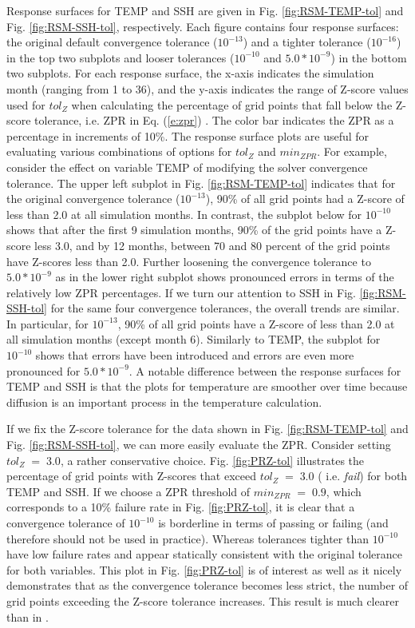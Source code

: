 \documentclass[gmd, manuscript]{copernicus}
\begin{document}
Response surfaces for TEMP and SSH are given in Fig. \ref{fig:RSM-TEMP-tol} and Fig. \ref{fig:RSM-SSH-tol}, respectively.  Each figure contains four response surfaces: the original default convergence tolerance ($10^{-13}$) and a tighter tolerance ($10^{-16}$) in the top two subplots and looser tolerances ($10^{-10}$ and $5.0*10^{-9}$) in the bottom two subplots.  For each response surface, the x-axis indicates the simulation month (ranging from 1 to 36), and the y-axis indicates the range of Z-score values used for $tol_{Z}$ when calculating the percentage of grid points that fall below the Z-score tolerance, i.e. ZPR in Eq. (\ref{e:zpr}) . The color bar indicates the ZPR as a percentage in increments of 10\%.  The response surface plots are useful for evaluating various combinations of options for $tol_{Z}$ and $min_{ZPR}$. For example, consider the effect on variable TEMP of modifying the solver convergence tolerance.  The upper left subplot in Fig. \ref{fig:RSM-TEMP-tol} indicates that for the original convergence tolerance ($10^{-13}$),  90\% of all grid points had a Z-score of less than 2.0 at all simulation months.  In contrast, the subplot below for $10^{-10}$ shows that after the first 9 simulation months, 90\% of the grid points have a Z-score less 3.0, and by 12 months, between 70 and 80 percent of the grid points have Z-scores less than 2.0. Further loosening the convergence tolerance to $5.0*10^{-9}$ as in the lower right subplot shows pronounced errors in terms of the relatively low ZPR percentages.  If we turn our attention to SSH in Fig. \ref{fig:RSM-SSH-tol} for the same four convergence tolerances, the overall trends are similar.  In particular, for $10^{-13}$, 90\% of all grid points have a Z-score of less than 2.0 at all simulation months (except month 6).  Similarly to TEMP, the subplot for $10^{-10}$ shows that errors have been introduced and errors are even more pronounced for $5.0*10^{-9}$. A notable difference between the response surfaces for TEMP and SSH is that the plots for temperature are smoother over time because diffusion is an important process in the temperature calculation.

If we fix the Z-score tolerance for the data shown in Fig. \ref{fig:RSM-TEMP-tol} and Fig. \ref{fig:RSM-SSH-tol}, we can more easily evaluate the ZPR.
Consider setting $tol_{Z} \; = \; 3.0$, a rather conservative choice. Fig. \ref{fig:PRZ-tol} illustrates the percentage of grid points with Z-scores that exceed $tol_{Z} \; = \; 3.0$ ( i.e. \textit{fail}) for both TEMP and SSH. If we choose a ZPR threshold of $min_{ZPR} \; = \; 0.9$, which corresponds to a 10\% failure rate in Fig. \ref{fig:PRZ-tol}, it is clear that a convergence tolerance of $10^{-10}$ is borderline in terms of passing or failing (and therefore should not be used in practice).  Whereas tolerances tighter than $10^{-10}$ have low failure rates and appear statically consistent with the original tolerance for both variables.  This plot in Fig. \ref{fig:PRZ-tol} is of interest as well as it nicely demonstrates that as the convergence tolerance becomes less strict, the number of grid points exceeding the Z-score tolerance increases.  This result is much clearer than in \cite{yong2015}.
\end{document}
